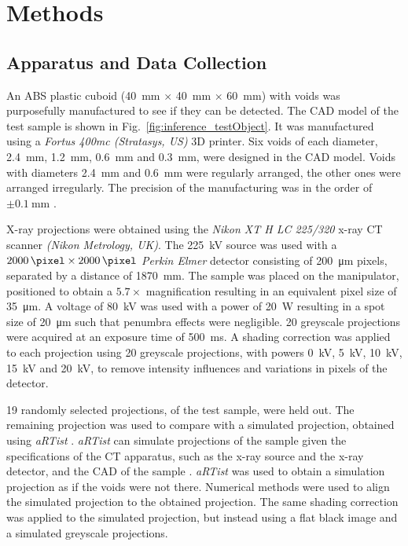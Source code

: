 \documentclass{article}
\begin{document}
\section{Methods}

\subsection{Apparatus and Data Collection}
\label{subsection:appratus}

An ABS plastic cuboid (\SI{40}{\milli\metre} $\times$ \SI{40}{\milli\metre} $\times$ \SI{60}{\milli\metre}) with voids was purposefully manufactured to see if they can be detected. The CAD model of the test sample is shown in Fig.~\ref{fig:inference_testObject}. It was manufactured using a \emph{Fortus 400mc (Stratasys, US)} 3D printer. Six voids of each diameter, \SI{2.4}{\milli\metre}, \SI{1.2}{\milli\metre}, \SI{0.6}{\milli\metre} and \SI{0.3}{\milli\metre}, were designed in the CAD model. Voids with diameters \SI{2.4}{\milli\metre} and \SI{0.6}{\milli\metre} were regularly arranged, the other ones were arranged irregularly. The precision of the manufacturing was in the order of $\pm\SI{0.1}{\milli\metre}$ \citep{hanseen2013fortus}.

X-ray projections were obtained using the \emph{Nikon XT H LC 225/320} x-ray CT scanner \emph{(Nikon Metrology, UK)}. The \SI{225}{\kilo\volt} source was used with a $\SI{2000}{\pixel}\times\SI{2000}{\pixel}$ \emph{Perkin Elmer} detector consisting of \SI{200}{\micro\metre} pixels, separated by a distance of \SI{1870}{\milli\metre}. The sample was placed on the manipulator, positioned to obtain a $5.7\times$ magnification resulting in an equivalent pixel size of \SI{35}{\micro\metre}. A voltage of \SI{80}{\kilo\volt} was used with a power of \SI{20}{\watt} resulting in a spot size of \SI{20}{\micro\metre} such that penumbra effects \citep{kueh2016modelling} were negligible. 20 greyscale projections were acquired at an exposure time of \SI{500}{\milli\second}. A shading correction \citep{seibert1998flat} was applied to each projection using 20 greyscale projections, with powers \SI{0}{\kilo\volt}, \SI{5}{\kilo\volt}, \SI{10}{\kilo\volt}, \SI{15}{\kilo\volt} and \SI{20}{\kilo\volt}, to remove intensity influences and variations in pixels of the detector.

19 randomly selected projections, of the test sample, were held out. The remaining projection was used to compare with a simulated projection, obtained using \emph{aRTist} \citep{bellon2012radiographic, bellon2007artist, jaenisch2008artist}. \emph{aRTist} can simulate projections of the sample given the specifications of the CT apparatus, such as the x-ray source and the x-ray detector, and the
CAD of the sample \citep{bellon2011simulation, deresch2012simulating}. \emph{aRTist} was used to obtain a simulation projection as if the voids were not there. Numerical methods were used to align the simulated projection to the obtained projection. The same shading correction was applied to the simulated projection, but instead using a flat black image and a simulated greyscale projections.
\end{document}
